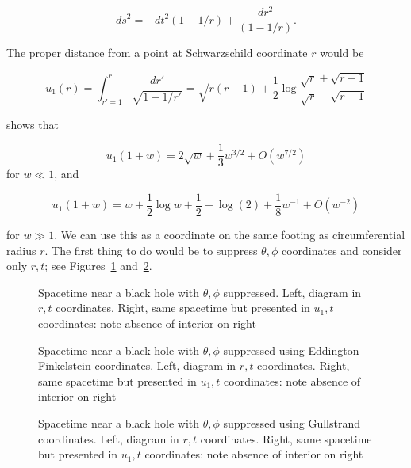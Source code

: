 \documentclass{article}
\begin{document}
\begin{equation}
  ds^2=-dt^2\left(1-1/r\right)
  +\frac{dr^2}{\left(1-1/r\right)}.
\end{equation}

The proper distance from a point at Schwarzschild coordinate $r$ would be

\begin{equation}
  u_1(r)=
  \int_{r'=1}^r\frac{dr'}{\sqrt{1-1/r'}}=
  \sqrt{r(r-1)} + \frac{1}{2}\log\frac{\sqrt{r}+\sqrt{r-1}}{\sqrt{r}-\sqrt{r-1}}
  \end{equation}

\cite{hankin2021} shows that



\begin{equation}
  u_1(1+w)=2\sqrt{w} + \frac{1}{3}w^{3/2} + O(w^{7/2})
\end{equation}
for $w\ll 1$, and 

\begin{equation}
  u_1(1+w)=w + \frac{1}{2}\log w + \frac{1}{2} +
  \log(2) + \frac{1}{8}w^{-1} + O(w^{-2})
\end{equation}

for $w\gg 1$.  We can use this as a coordinate on the same footing as
circumferential radius $r$.  The first thing to do would be to
suppress $\theta,\phi$ coordinates and consider only $r,t$; see
Figures~\ref{schwarzschild} and~\ref{eddington}.

\begin{figure}%
    \centering
    \caption{Spacetime near a black hole with $\theta,\phi$
      suppressed.  Left, diagram in $r,t$ coordinates.  Right, same
      spacetime but presented in $u_1,t$ coordinates: note absence of interior on right}
    \label{schwarzschild}%
\end{figure}

\begin{figure}%
    \centering
    \caption{Spacetime near a black hole with $\theta,\phi$ suppressed
      using Eddington-Finkelstein coordinates.  Left, diagram in $r,t$
      coordinates.  Right, same spacetime but presented in $u_1,t$
      coordinates: note absence of interior on right}
    \label{eddington}%
\end{figure}

\begin{figure}%
    \centering
    \caption{Spacetime near a black hole with $\theta,\phi$ suppressed
      using Gullstrand coordinates.  Left, diagram in $r,t$
      coordinates.  Right, same spacetime but presented in $u_1,t$
      coordinates: note absence of interior on right}
    \label{gullstrand}%
\end{figure}


  
\end{document}
